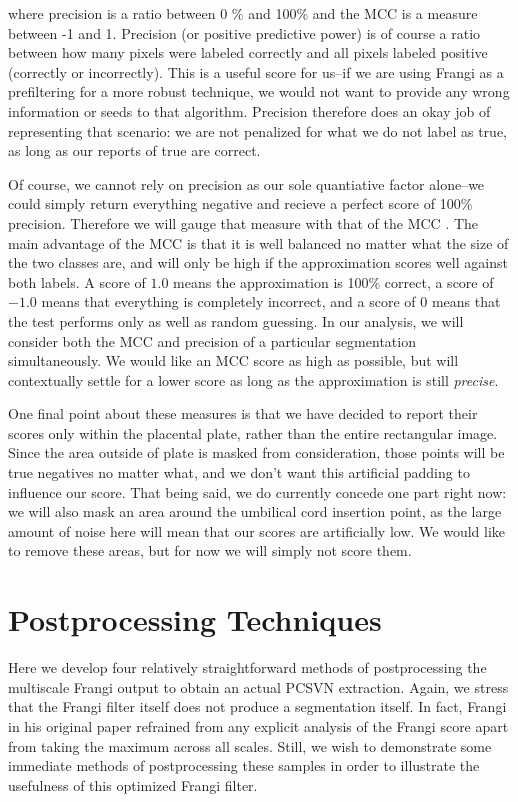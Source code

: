 where precision is a ratio between 0 \% and 100\% and the MCC is a measure between -1 and 1. Precision (or positive predictive power) is of course a ratio between how many pixels were labeled correctly and all pixels labeled positive (correctly or incorrectly). This is a useful score for us--if we are using Frangi as a prefiltering for a more robust technique, we would not want to provide any wrong information or seeds to that algorithm. Precision therefore does an okay job of representing that scenario: we are not penalized for what we do not label as true, as long as our reports of true are correct.

Of course, we cannot rely on precision as our sole quantiative factor alone--we could simply return everything negative and recieve a perfect score of 100\% precision. Therefore we will gauge that measure with that of the MCC \cite{mcc-original-paper}. The main advantage of the MCC is that it is well balanced no matter what the size of the two classes are, and will only be high if the approximation scores well against both labels. A score of $1.0$ means the approximation is 100\% correct, a score of $-1.0$ means that everything is completely incorrect, and a score of $0$ means that the test performs only as well as random guessing. In our analysis, we will consider both the MCC and precision of a particular segmentation simultaneously. We would like an MCC score as high as possible, but will contextually settle for a lower score as long as the approximation is still \textit{precise}.

One final point about these measures is that we have decided to report their scores only within the placental plate, rather than the entire rectangular image. Since the area outside of plate is masked from consideration, those points will be true negatives no matter what, and we don't want this artificial padding to influence our score. That being said, we do currently concede one part right now: we will also mask an area around the umbilical cord insertion point, as the large amount of noise here will mean that our scores are artificially low. We would like to remove these areas, but for now we will simply not score them. 

\section{Postprocessing Techniques}
Here we develop four relatively straightforward methods of postprocessing the multiscale Frangi output to obtain an actual PCSVN extraction. Again, we stress that the Frangi filter itself does not produce a segmentation itself. In fact, Frangi in his original paper \cite{frangi-paper} refrained from any explicit analysis of the Frangi score apart from taking the maximum across all scales. Still, we wish to demonstrate some immediate methods of postprocessing these samples in order to illustrate the usefulness of this optimized Frangi filter. 



